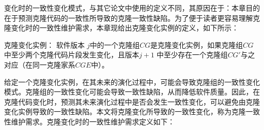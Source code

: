 变化时的一致性变化模式，与其它论文中使用的定义不同，其原因在于：本章目的在于预测克隆代码的一致性所导致的克隆一致性缺陷。为了便于读者更容易理解克隆变化时的一致性维护需求，本章现给出克隆变化实例的定义，如下所示：\\


\begin{definition}
\label{def-changinginstance}
克隆变化实例：
软件版本 $j$中的一个克隆组$CG$是克隆变化实例，如果克隆组$CG$中至少两个克隆代码片段发生变化，且版本$j+1$ 中至少存在一个克隆组$CG'$与之对应（在同一克隆家系$CGE$中）。 
\end{definition}



给定一个克隆变化实例，在其未来的演化过程中，可能会导致克隆组的一致性变化模式。克隆组的一致性变化可能会导致一致性缺陷，从而降低软件质量。因此，在克隆代码变化时，预测其未来演化过程中是否会发生一致性变化，可以避免由克隆变化实例导致的一致性缺陷。本文将克隆变化所导致的一致性变化，称为克隆一致性维护需求。克隆变化时的一致性维护需求定义如下：\\


